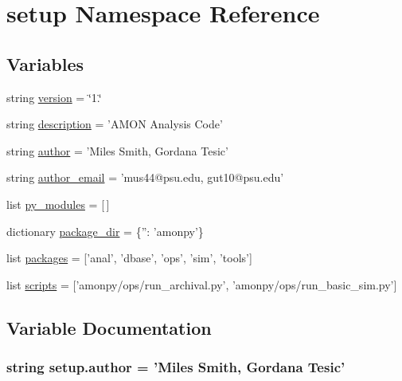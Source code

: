 \hypertarget{namespacesetup}{\section{setup Namespace Reference}
\label{namespacesetup}
}
\subsection*{Variables}
\begin{DoxyCompactItemize}
\item 
string \hyperlink{namespacesetup_ab177531e7a80674a3db3de2d79eb8be7}{version} = \char`\"{}1.\char`\"{}
\item 
string \hyperlink{namespacesetup_ade8aa54df2083113a10326ea2fe7934b}{description} = 'A\-M\-O\-N Analysis Code'
\item 
string \hyperlink{namespacesetup_ac83393287a89728d636e4ae9f4ac914f}{author} = 'Miles Smith, Gordana Tesic'
\item 
string \hyperlink{namespacesetup_aa144ac52ed417d5c65d7377e0e75673e}{author\-\_\-email} = 'mus44@psu.\-edu, gut10@psu.\-edu'
\item 
list \hyperlink{namespacesetup_a2f17d3b44c4dab5ffba788f40bf1397a}{py\-\_\-modules} = \mbox{[}$\,$\mbox{]}
\item 
dictionary \hyperlink{namespacesetup_abf4f1022dcd783f10f7bd23ec931f32b}{package\-\_\-dir} = \{''\-: 'amonpy'\}
\item 
list \hyperlink{namespacesetup_aada4406eeab94f62c5f72fee617f0b82}{packages} = \mbox{[}'anal', 'dbase', 'ops', 'sim', 'tools'\mbox{]}
\item 
list \hyperlink{namespacesetup_ac1f45f8d37050b278bf63c812b1130dd}{scripts} = \mbox{[}'amonpy/ops/run\-\_\-archival.\-py', 'amonpy/ops/run\-\_\-basic\-\_\-sim.\-py'\mbox{]}
\end{DoxyCompactItemize}


\subsection{Variable Documentation}
\hypertarget{namespacesetup_ac83393287a89728d636e4ae9f4ac914f}{
\subsubsection[{author}]{\setlength{\rightskip}{0pt plus 5cm}string setup.\-author = 'Miles Smith, Gordana Tesic'}}\label{namespacesetup_ac83393287a89728d636e4ae9f4ac914f}


